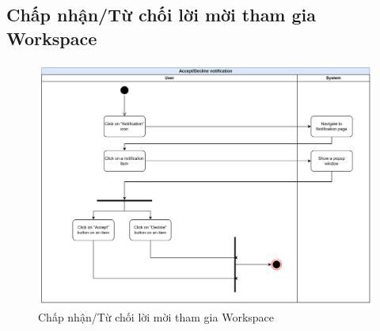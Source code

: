 \subsection{Chấp nhận/Từ chối lời mời tham gia Workspace}
\begin{figure}[H]
    \centering
    \includegraphics[width=\linewidth]{Content/Phân tích và thiết kế hệ thống/documents/Sơ đồ hoạt động/images/acceptDeclineNotification.png}
    \vspace{0.5cm}
    \caption{Chấp nhận/Từ chối lời mời tham gia Workspace}
    \label{fig:Chấp nhận/Từ chối lời mời tham gia Workspace}
\end{figure}